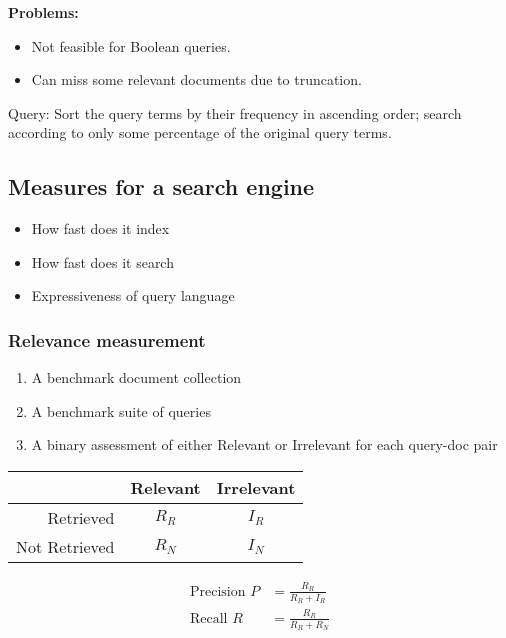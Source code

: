 \textbf{Problems:}
\begin{itemize}
    \item Not feasible for Boolean queries. 
    \item Can miss some relevant documents due to truncation. 
\end{itemize}

Query: Sort the query terms by their frequency in ascending order; search according to only some percentage of the original query terms. 

\subsection{Measures for a search engine}
\begin{itemize}
    \item How fast does it index
    \item How fast does it search
    \item Expressiveness of query language
\end{itemize}

\subsubsection{Relevance measurement}
\begin{enumerate}
    \item A benchmark document collection
    \item A benchmark suite of queries
    \item A binary assessment of either Relevant or Irrelevant for each query-doc pair   
\end{enumerate}
\begin{table}[H]
    \centering
    \begin{tabular}[c]{|r|c|c|}\hline
        & Relevant & Irrelevant\\ \hline
        Retrieved & $R_R$ & $I_R$\\ \hline
        Not Retrieved & $R_N$ & $I_N$ \\  \hline
    \end{tabular}
\end{table}
\begin{align*}
    \text{Precision }P&=\frac{R_R}{R_R+I_R}\\
    \text{Recall }R&=\frac{R_R}{R_R+R_N}
\end{align*}